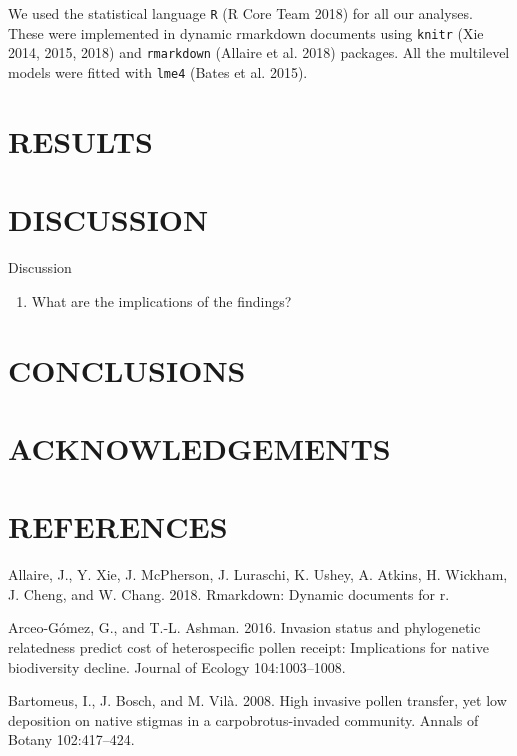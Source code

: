 \documentclass[11pt,a4paper]{article}
\providecommand{\tightlist}{%
  \setlength{\itemsep}{0pt}\setlength{\parskip}{0pt}}
\begin{document}
We used the statistical language \texttt{R} (R Core Team 2018) for all
our analyses. These were implemented in dynamic rmarkdown documents
using \texttt{knitr} (Xie 2014, 2015, 2018) and \texttt{rmarkdown}
(Allaire et al. 2018) packages. All the multilevel models were fitted
with \texttt{lme4} (Bates et al. 2015).

\section{RESULTS}\label{results}

\section{DISCUSSION}\label{discussion}

Discussion

\begin{enumerate}
\def\labelenumi{\arabic{enumi}.}
\tightlist
\item
  What are the implications of the findings?
\end{enumerate}

\section{CONCLUSIONS}\label{conclusions}

\section{ACKNOWLEDGEMENTS}\label{acknowledgements}

\section{REFERENCES}\label{references}

\hypertarget{refs}{}
\hypertarget{ref-Allaire_2018}{}
Allaire, J., Y. Xie, J. McPherson, J. Luraschi, K. Ushey, A. Atkins, H.
Wickham, J. Cheng, and W. Chang. 2018. Rmarkdown: Dynamic documents for
r.

\hypertarget{ref-arceo2016}{}
Arceo-Gómez, G., and T.-L. Ashman. 2016. Invasion status and
phylogenetic relatedness predict cost of heterospecific pollen receipt:
Implications for native biodiversity decline. Journal of Ecology
104:1003--1008.

\hypertarget{ref-bartomeus2008}{}
Bartomeus, I., J. Bosch, and M. Vilà. 2008. High invasive pollen
transfer, yet low deposition on native stigmas in a carpobrotus-invaded
community. Annals of Botany 102:417--424.
\end{document}
